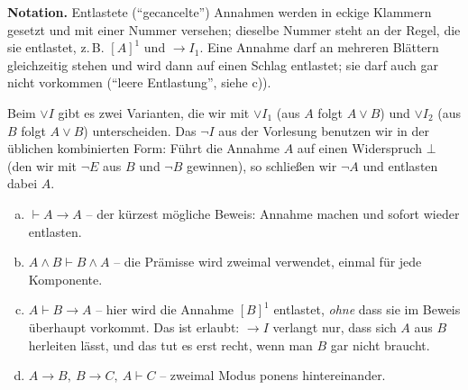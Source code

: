 \begin{loesung}
\textbf{Notation.} Entlastete (\enquote{gecancelte}) Annahmen werden in eckige Klammern gesetzt und mit einer Nummer versehen; dieselbe Nummer steht an der Regel, die sie entlastet, z.\,B. $[A]^1$ und $\to I_1$. Eine Annahme darf an mehreren Blättern gleichzeitig stehen und wird dann auf einen Schlag entlastet; sie darf auch gar nicht vorkommen (\enquote{leere Entlastung}, siehe c)).

Beim $\vee I$ gibt es zwei Varianten, die wir mit $\vee I_1$ (aus $A$ folgt $A\vee B$) und $\vee I_2$ (aus $B$ folgt $A\vee B$) unterscheiden. Das $\neg I$ aus der Vorlesung benutzen wir in der üblichen kombinierten Form: Führt die Annahme $A$ auf einen Widerspruch $\bot$ (den wir mit $\neg E$ aus $B$ und $\neg B$ gewinnen), so schließen wir $\neg A$ und entlasten dabei $A$.

\begin{enumerate}[a)]

  \item $\vdash A\to A$ -- der kürzest mögliche Beweis: Annahme machen und sofort wieder entlasten.
  \begin{prooftree}
  \end{prooftree}

  \item $A\wedge B\vdash B\wedge A$ -- die Prämisse wird zweimal verwendet, einmal für jede Komponente.
  \begin{prooftree}
  \end{prooftree}

  \item $A\vdash B\to A$ -- hier wird die Annahme $[B]^1$ entlastet, \emph{ohne} dass sie im Beweis überhaupt vorkommt. Das ist erlaubt: $\to I$ verlangt nur, dass sich $A$ aus $B$ herleiten lässt, und das tut es erst recht, wenn man $B$ gar nicht braucht.
  \begin{prooftree}
  \end{prooftree}

  \item $A\to B,\ B\to C,\ A\vdash C$ -- zweimal Modus ponens hintereinander.
  \begin{prooftree}
  \end{prooftree}


\end{enumerate}
\end{loesung}
